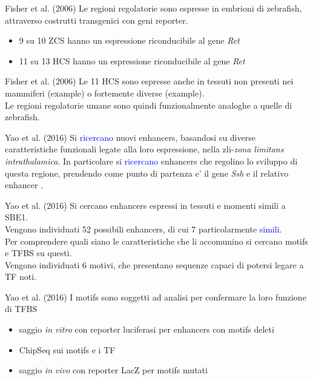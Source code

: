 \documentclass{beamer}
\newcommand{\warn}[1]{\textcolor{blue}{#1}}
\begin{document}
    \begin{frame}{Fisher et al. (2006)}
        Le regioni regolatorie sono espresse in embrioni di zebrafish,
        attraverso costrutti transgenici con geni reporter.
        \begin{itemize}
            \item 9 su 10 ZCS hanno un espressione riconducibile al gene \emph{Ret}
            \item 11 su 13 HCS hanno un espressione riconducibile al gene \emph{Ret}
        \end{itemize}
    \end{frame}

    \begin{frame}{Fisher et al. (2006)}
        Le 11 HCS sono espresse anche in tessuti non presenti nei mammiferi (example)
        o fortemente diverse (example). \\
        Le regioni regolatorie umane sono quindi funzionalmente analoghe a quelle di zebrafish.
    \end{frame}


    \begin{frame}{Yao et al. (2016)}
        Si \warn{ricercano} nuovi enhancers, basandosi su diverse caratteristiche funzionali
        legate alla loro espressione, nella zli-\emph{zona limitans intrathalamica}.
        In particolare si \warn{ricercano} enhancers che regolino lo sviluppo di questa regione,
        prendendo come punto di partenza e' il gene \emph{Ssh} e il relativo enhancer .
    \end{frame}

    \begin{frame}{Yao et al. (2016)}
        Si cercano enhancers espressi in tessuti e momenti simili a SBE1.\\
        Vengono individuati 52 possibili enhancers, di cui 7 particolarmente \warn{simili}.\\
        Per comprendere quali siano le caratteristiche che li accomunino si
        cercano motifs e TFBS su questi.\\
        Vengono individuati 6 motivi, che presentano sequenze capaci di potersi legare a TF noti.
    \end{frame}

    \begin{frame}{Yao et al. (2016)}
        I motifs sono soggetti ad analisi per confermare la loro funzione di TFBS
        \begin{itemize}
            \item saggio \emph{in vitro} con reporter luciferasi per enhancers con motifs deleti
            \item ChipSeq sui motifs e i TF
            \item saggio \emph{in vivo} con reporter LacZ per motifs mutati
        \end{itemize}
    \end{frame}
\end{document}
